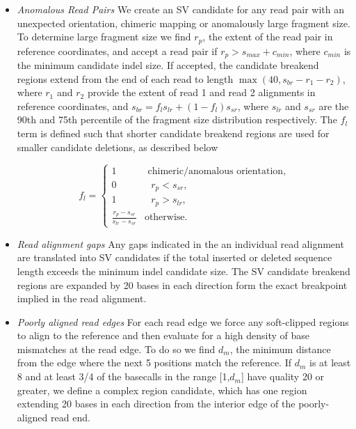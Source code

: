 \documentclass{article}
\begin{document}
\begin{itemize}
\item \textit{Anomalous Read Pairs} We create an SV candidate for any read pair with an unexpected orientation, chimeric mapping or anomalously large fragment size. To determine large fragment size we find $r_p$, the extent of the read pair in reference coordinates, and accept a read pair if $r_p > s_{max} + c_{min}$, where $c_{min}$ is the minimum candidate indel size. If accepted, the candidate breakend regions extend from the end of each read to length $\max(40, s_{br} - r_1 - r_2)$, where $r_1$ and $r_2$ provide the extent of read 1 and read 2 alignments in reference coordinates, and $s_{br}  = f_l s_{lr} + (1 - f_l) s_{sr}$, where $s_{lr}$ and $s_{sr}$ are the 90th and 75th percentile of the fragment size distribution respectively. The $f_l$ term is defined such that shorter candidate breakend regions are used for smaller candidate deletions, as described below

\begin{equation*}
f_l =
\left\{
\begin{array}{cl}
1 & \mbox{ chimeric/anomalous orientation,} \\
0 & \mbox{ $r_p < s_{sr}$, } \\
1 & \mbox{ $r_p > s_{lr}$, } \\
\frac{r_p - s_{sr}} {s_{lr} - s_{sr}} & \mbox{otherwise.}
\end{array}
\right.
\end{equation*}

\item \textit{Read alignment gaps} Any gaps indicated in the an individual read alignment are translated into SV candidates if the total inserted or deleted sequence length exceeds the minimum indel candidate size. The SV candidate breakend regions are expanded by 20 bases in each direction form the exact breakpoint implied in the read alignment.

\item \textit{Poorly aligned read edges} For each read edge we force any soft-clipped regions to align to the reference and then evaluate for a high density of base mismatches at the read edge. To do so we find $d_{m}$, the minimum distance from the edge where the next 5 positions match the reference. If $d_{m}$ is at least 8 and at least 3/4 of the basecalls in the range [1,$d_{m}$] have quality 20 or greater, we define a complex region candidate, which has one region extending 20 bases in each direction from the interior edge of the poorly-aligned read end.


\end{itemize}
\end{document}
